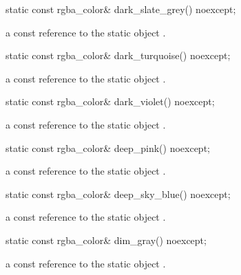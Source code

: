 \begin{itemdecl}
static const rgba_color& dark_slate_grey() noexcept;
\end{itemdecl}
\begin{itemdescr}
\pnum
\returns
a const reference to the static  object .
\end{itemdescr}

\begin{itemdecl}
static const rgba_color& dark_turquoise() noexcept;
\end{itemdecl}
\begin{itemdescr}
\pnum
\returns
a const reference to the static  object .
\end{itemdescr}

\begin{itemdecl}
static const rgba_color& dark_violet() noexcept;
\end{itemdecl}
\begin{itemdescr}
\pnum
\returns
a const reference to the static  object .
\end{itemdescr}

\begin{itemdecl}
static const rgba_color& deep_pink() noexcept;
\end{itemdecl}
\begin{itemdescr}
\pnum
\returns
a const reference to the static  object .
\end{itemdescr}

\begin{itemdecl}
static const rgba_color& deep_sky_blue() noexcept;
\end{itemdecl}
\begin{itemdescr}
\pnum
\returns
a const reference to the static  object .
\end{itemdescr}

\begin{itemdecl}
static const rgba_color& dim_gray() noexcept;
\end{itemdecl}
\begin{itemdescr}
\pnum
\returns
a const reference to the static  object .
\end{itemdescr}

